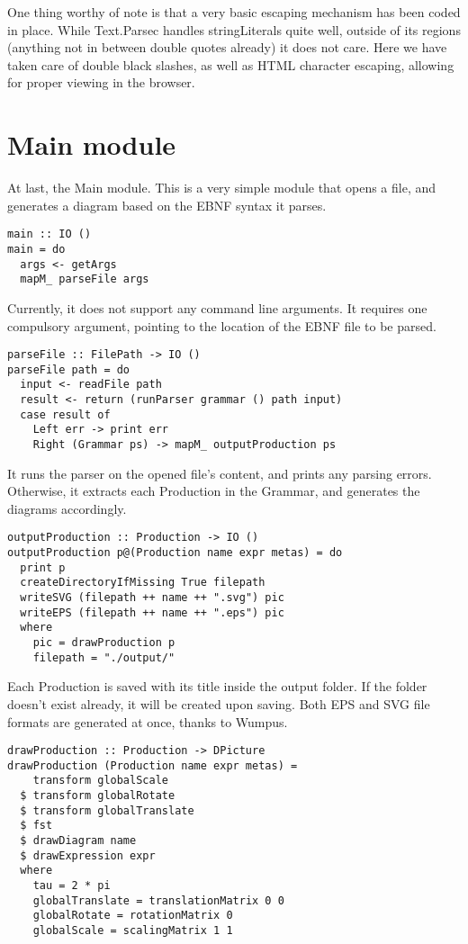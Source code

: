 \documentclass[a4paper]{article}
\begin{document}
One thing worthy of note is that a very basic escaping mechanism has been coded in place. While Text.Parsec handles stringLiterals quite well, outside of its regions (anything not in between double quotes already) it does not care. Here we have taken care of double black slashes, as well as HTML character escaping, allowing for proper viewing in the browser.

\section{Main module}
At last, the Main module. This is a very simple module that opens a file, and generates a diagram based on the EBNF syntax it parses.

\begin{verbatim}
main :: IO ()
main = do
  args <- getArgs
  mapM_ parseFile args
\end{verbatim}

Currently, it does not support any command line arguments. It requires one compulsory argument, pointing to the location of the EBNF file to be parsed.

\begin{verbatim}
parseFile :: FilePath -> IO ()
parseFile path = do
  input <- readFile path
  result <- return (runParser grammar () path input)
  case result of
    Left err -> print err
    Right (Grammar ps) -> mapM_ outputProduction ps
\end{verbatim}

It runs the parser on the opened file's content, and prints any parsing errors. Otherwise, it extracts each Production in the Grammar, and generates the diagrams accordingly.

\begin{verbatim}
outputProduction :: Production -> IO ()
outputProduction p@(Production name expr metas) = do
  print p
  createDirectoryIfMissing True filepath
  writeSVG (filepath ++ name ++ ".svg") pic
  writeEPS (filepath ++ name ++ ".eps") pic
  where 
    pic = drawProduction p
    filepath = "./output/"
\end{verbatim}

Each Production is saved with its title inside the output folder. If the folder doesn't exist already, it will be created upon saving. Both EPS and SVG file formats are generated at once, thanks to Wumpus.

\begin{verbatim}
drawProduction :: Production -> DPicture
drawProduction (Production name expr metas) =
    transform globalScale
  $ transform globalRotate
  $ transform globalTranslate
  $ fst
  $ drawDiagram name
  $ drawExpression expr
  where
    tau = 2 * pi
    globalTranslate = translationMatrix 0 0
    globalRotate = rotationMatrix 0
    globalScale = scalingMatrix 1 1
\end{verbatim}
\end{document}
